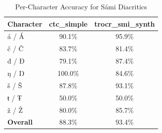 \begin{table}[t]
\centering
\caption{Per-Character Accuracy for S\'{a}mi Diacritics}
\label{tab:diacritics}
\small
\begin{tabular}{@{}lcc@{}}
\toprule
\textbf{Character} & \textbf{ctc_simple} & \textbf{trocr_smi_synth} \\
\midrule
á / Á & 90.1\% & 95.9\% \\
č / Č & 83.7\% & 81.4\% \\
đ / Đ & 79.1\% & 87.4\% \\
ŋ / Ŋ & 100.0\% & 84.6\% \\
š / Š & 87.8\% & 93.1\% \\
ŧ / Ŧ & 50.0\% & 50.0\% \\
ž / Ž & 80.0\% & 85.7\% \\
\midrule
\textbf{Overall} & 88.3\% & 93.4\% \\
\bottomrule
\end{tabular}
\end{table}
